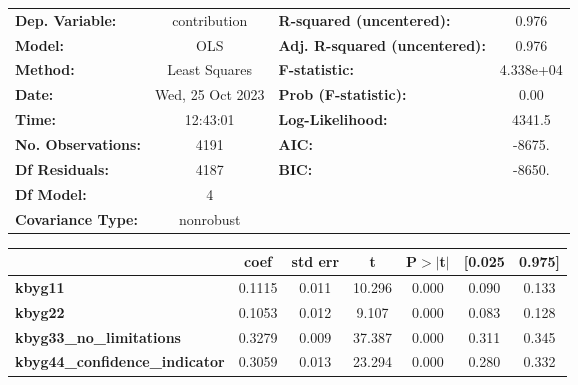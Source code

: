 \begin{center}
\begin{tabular}{lclc}
\toprule
\textbf{Dep. Variable:}                &   contribution   & \textbf{  R-squared (uncentered):}      &     0.976   \\
\textbf{Model:}                        &       OLS        & \textbf{  Adj. R-squared (uncentered):} &     0.976   \\
\textbf{Method:}                       &  Least Squares   & \textbf{  F-statistic:       }          & 4.338e+04   \\
\textbf{Date:}                         & Wed, 25 Oct 2023 & \textbf{  Prob (F-statistic):}          &     0.00    \\
\textbf{Time:}                         &     12:43:01     & \textbf{  Log-Likelihood:    }          &    4341.5   \\
\textbf{No. Observations:}             &        4191      & \textbf{  AIC:               }          &    -8675.   \\
\textbf{Df Residuals:}                 &        4187      & \textbf{  BIC:               }          &    -8650.   \\
\textbf{Df Model:}                     &           4      & \textbf{                     }          &             \\
\textbf{Covariance Type:}              &    nonrobust     & \textbf{                     }          &             \\
\bottomrule
\end{tabular}
\begin{tabular}{lcccccc}
                                       & \textbf{coef} & \textbf{std err} & \textbf{t} & \textbf{P$> |$t$|$} & \textbf{[0.025} & \textbf{0.975]}  \\
\midrule
\textbf{kbyg11}                        &       0.1115  &        0.011     &    10.296  &         0.000        &        0.090    &        0.133     \\
\textbf{kbyg22}                        &       0.1053  &        0.012     &     9.107  &         0.000        &        0.083    &        0.128     \\
\textbf{kbyg33\_no\_limitations}       &       0.3279  &        0.009     &    37.387  &         0.000        &        0.311    &        0.345     \\
\textbf{kbyg44\_confidence\_indicator} &       0.3059  &        0.013     &    23.294  &         0.000        &        0.280    &        0.332     \\

\end{tabular}
\end{center}
